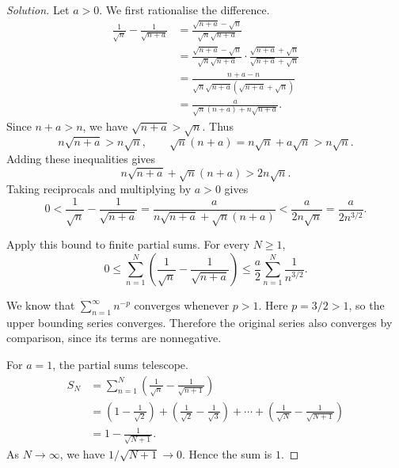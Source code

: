 \begin{proof}[Solution]
  Let $a>0$. We first rationalise the difference.
  \begin{align*}
    \frac{1}{\sqrt n}-\frac{1}{\sqrt{n+a}}
      &=\frac{\sqrt{n+a}-\sqrt n}{\sqrt n\sqrt{n+a}}\\
      &=\frac{\sqrt{n+a}-\sqrt n}{\sqrt n\sqrt{n+a}}
        \cdot\frac{\sqrt{n+a}+\sqrt n}{\sqrt{n+a}+\sqrt n}\\
      &=\frac{n+a-n}
        {\sqrt n\sqrt{n+a}(\sqrt{n+a}+\sqrt n)}\\
      &=\frac{a}{\sqrt n(n+a)+n\sqrt{n+a}}.
  \end{align*}
  Since $n+a>n$, we have $\sqrt{n+a}>\sqrt n$. Thus
  \[
    n\sqrt{n+a}>n\sqrt n,\qquad
    \sqrt n(n+a)=n\sqrt n+a\sqrt n>n\sqrt n.
  \]
  Adding these inequalities gives
  \[
    n\sqrt{n+a}+\sqrt n(n+a)>2n\sqrt n.
  \]
  Taking reciprocals and multiplying by $a>0$ gives
  \[
    0<
    \frac{1}{\sqrt n}-\frac{1}{\sqrt{n+a}}
    =\frac{a}{n\sqrt{n+a}+\sqrt n(n+a)}
    <\frac{a}{2n\sqrt n}=\frac{a}{2n^{3/2}}.
  \]

  Apply this bound to finite partial sums. For every $N\ge1$,
  \[
    0\le\sum_{n=1}^{N}
      \left(\frac{1}{\sqrt n}-\frac{1}{\sqrt{n+a}}\right)
    \le\frac a2\sum_{n=1}^{N}\frac{1}{n^{3/2}}.
  \]

  We know that $\sum_{n=1}^{\infty}n^{-p}$ converges whenever $p>1$.
  Here $p=3/2>1$, so the upper bounding series converges. Therefore
  the original series also converges
  by comparison, since its terms are nonnegative.

  For $a=1$, the partial sums telescope.
  \begin{align*}
    S_N
      &=\sum_{n=1}^{N}
        \left(\frac{1}{\sqrt n}-\frac{1}{\sqrt{n+1}}\right)\\
      &=\left(1-\frac{1}{\sqrt2}\right)
        +\left(\frac{1}{\sqrt2}-\frac{1}{\sqrt3}\right)
        +\cdots+\left(\frac{1}{\sqrt N}-\frac{1}{\sqrt{N+1}}\right)\\
      &=1-\frac{1}{\sqrt{N+1}}.
  \end{align*}
  As $N\to\infty$, we have $1/\sqrt{N+1}\to0$. Hence the sum is $1$.
\end{proof}
